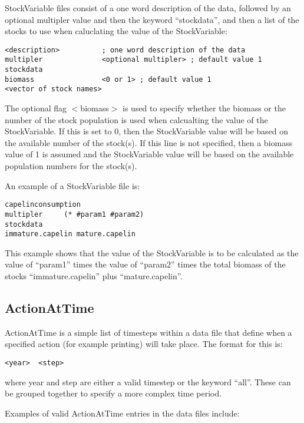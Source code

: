 \documentclass[]{book}
\begin{document}
StockVariable files consist of a one word description of the data,
followed by an optional multipler value and then the keyword
``stockdata'', and then a list of the stocks to use when caluclating the
value of the StockVariable:

\begin{verbatim}
<description>          ; one word description of the data
multipler              <optional multipler> ; default value 1
stockdata
biomass                <0 or 1> ; default value 1
<vector of stock names>
\end{verbatim}

The optional flag \(<\)biomass\(>\) is used to specify whether the biomass
or the number of the stock population is used when calcualting the value
of the StockVariable. If this is set to 0, then the StockVariable value
will be based on the available number of the stock(s). If this line is
not specified, then a biomass value of 1 is assumed and the
StockVariable value will be based on the available population numbers
for the stock(s).

An example of a StockVariable file is:

\begin{verbatim}
capelinconsumption
multipler     (* #param1 #param2)
stockdata
immature.capelin mature.capelin
\end{verbatim}

This example shows that the value of the StockVariable is to be
calculated as the value of ``param1'' times the value of ``param2'' times
the total biomass of the stocks ``immature.capelin'' plus
``mature.capelin''.

\hypertarget{subsec:aat}{%
\subsection{ActionAtTime}\label{subsec:aat}}

ActionAtTime is a simple list of timesteps within a data file that
define when a specified action (for example printing) will take place.
The format for this is:

\begin{verbatim}
<year>  <step>
\end{verbatim}

where year and step are either a valid timestep or the keyword ``all''.
These can be grouped together to specify a more complex time period.

Examples of valid ActionAtTime entries in the data files include:
\end{document}
